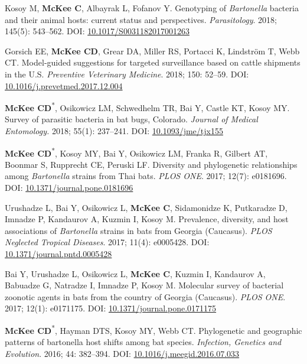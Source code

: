 \documentclass{cv}
\begin{document}
\begin{pubenum}
\item Kosoy M\textsuperscript{\dag}, \textbf{McKee C}\textsuperscript{\dag}, Albayrak L, Fofanov Y. Genotyping of \textit{Bartonella} bacteria and their animal hosts: current status and perspectives. \textit{Parasitology}. 2018; 145(5): 543--562. DOI: \href{https://doi.org/10.1017/S0031182017001263}{10.1017/S0031182017001263}

\item Gorsich EE, \textbf{McKee CD}, Grear DA, Miller RS, Portacci K, Lindström T, Webb CT. Model-guided suggestions for targeted surveillance based on cattle shipments in the U.S. \textit{Preventive Veterinary Medicine}. 2018; 150: 52--59. DOI: \href{https://doi.org/10.1016/j.prevetmed.2017.12.004}{10.1016/j.prevetmed.2017.12.004}

\item \textbf{McKee CD}\textsuperscript{*}, Osikowicz LM, Schwedhelm TR, Bai Y, Castle KT, Kosoy MY. Survey of parasitic bacteria in bat bugs, Colorado. \textit{Journal of Medical Entomology.} 2018; 55(1): 237--241. DOI: \href{https://doi.org/10.1093/jme/tjx155}{10.1093/jme/tjx155}

\item \textbf{McKee CD}\textsuperscript{*}, Kosoy MY, Bai Y, Osikowicz LM, Franka R, Gilbert AT, Boonmar S, Rupprecht CE, Peruski LF. Diversity and phylogenetic relationships among \textit{Bartonella} strains from Thai bats. \textit{PLOS ONE}. 2017; 12(7): e0181696. DOI: \href{https://doi.org/10.1371/journal.pone.0181696}{10.1371/journal.pone.0181696}

\item Urushadze L, Bai Y, Osikowicz L, \textbf{McKee C}, Sidamonidze K, Putkaradze D, Imnadze P, Kandaurov A, Kuzmin I, Kosoy M. Prevalence, diversity, and host associations of \textit{Bartonella} strains in bats from Georgia (Caucasus). \textit{PLOS Neglected Tropical Diseases}. 2017; 11(4): e0005428. DOI: \href{https://doi.org/10.1371/journal.pntd.0005428}{10.1371/journal.pntd.0005428}

\item Bai Y, Urushadze L, Osikowicz L, \textbf{McKee C}, Kuzmin I, Kandaurov A, Babuadze G, Natradze I, Imnadze P, Kosoy M. Molecular survey of bacterial zoonotic agents in bats from the country of Georgia (Caucasus). \textit{PLOS ONE}. 2017; 12(1): e0171175. DOI: \href{https://doi.org/10.1371/journal.pone.0171175}{10.1371/journal.pone.0171175}

\item \textbf{McKee CD}\textsuperscript{*}, Hayman DTS, Kosoy MY, Webb CT. Phylogenetic and geographic patterns of bartonella host shifts among bat species. \textit{Infection, Genetics and Evolution}. 2016; 44: 382--394. DOI: \href{https://doi.org/10.1016/j.meegid.2016.07.033}{10.1016/j.meegid.2016.07.033}


\end{pubenum}
\end{document}
